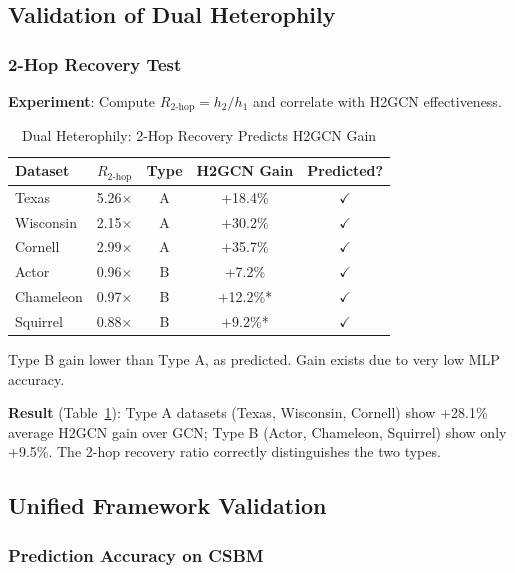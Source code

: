 \subsection{Validation of Dual Heterophily}

\subsubsection{2-Hop Recovery Test}

\textbf{Experiment}: Compute $R_{2\text{-hop}} = h_2/h_1$ and correlate with H2GCN effectiveness.

\begin{table}[t]
\centering
\caption{Dual Heterophily: 2-Hop Recovery Predicts H2GCN Gain}
\label{tab:2hop_h2gcn}
\begin{tabular}{@{}lcccc@{}}
\toprule
\textbf{Dataset} & \textbf{$R_{2\text{-hop}}$} & \textbf{Type} & \textbf{H2GCN Gain} & \textbf{Predicted?} \\
\midrule
Texas & 5.26$\times$ & A & +18.4\% & $\checkmark$ \\
Wisconsin & 2.15$\times$ & A & +30.2\% & $\checkmark$ \\
Cornell & 2.99$\times$ & A & +35.7\% & $\checkmark$ \\
\midrule
Actor & 0.96$\times$ & B & +7.2\% & $\checkmark$ \\
Chameleon & 0.97$\times$ & B & +12.2\%* & $\checkmark$ \\
Squirrel & 0.88$\times$ & B & +9.2\%* & $\checkmark$ \\
\bottomrule
\end{tabular}
\vspace{1mm}
\raggedright\small *Type B gain lower than Type A, as predicted. Gain exists due to very low MLP accuracy.
\end{table}

\textbf{Result} (Table~\ref{tab:2hop_h2gcn}): Type A datasets (Texas, Wisconsin, Cornell) show +28.1\% average H2GCN gain over GCN; Type B (Actor, Chameleon, Squirrel) show only +9.5\%. The 2-hop recovery ratio correctly distinguishes the two types.

\subsection{Unified Framework Validation}

\subsubsection{Prediction Accuracy on CSBM}

